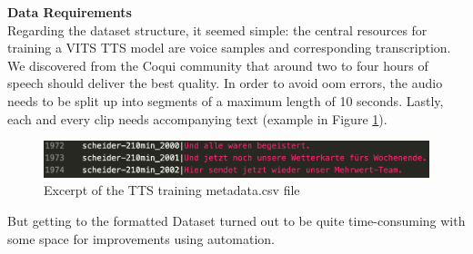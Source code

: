 \documentclass[
  a4paper,  %
  twoside,  %
  bibliography=totoc,
  headsepline,
  cleardoublepage=empty,
  parskip=half,
  draft=false
]{scrbook}
\begin{document}
\textbf{Data Requirements} \\
Regarding the dataset structure, it seemed simple: the central resources for training a VITS TTS model are voice samples and corresponding transcription. We discovered from the Coqui community that around two to four hours of speech should deliver the best quality. In order to avoid \gls{oom} errors, the audio needs to be split up into segments of a maximum length of 10 seconds. Lastly, each and every clip needs accompanying text (example in Figure \ref{fig:metadata.csv}).
\begin{figure}[h]
  \centering
  \includegraphics[width=1\textwidth]{./graphics/images/tts/csv.png}
  \caption{Excerpt of the TTS training metadata.csv file}
  \label{fig:metadata.csv}
\end{figure}
But getting to the formatted Dataset turned out to be quite time-consuming with some space for improvements using automation.
\end{document}
